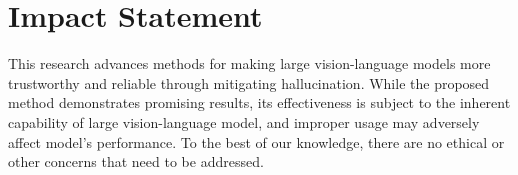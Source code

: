 \documentclass{article}
\theoremstyle{plain}
\theoremstyle{definition}
\theoremstyle{remark}
\begin{document}
\section*{Impact Statement}
This research advances methods for making large vision-language models more trustworthy and reliable through mitigating hallucination. While the proposed method demonstrates promising results, its effectiveness is subject to the inherent capability of large vision-language model, and improper usage may adversely affect model's performance. To the best of our knowledge, there are no ethical or other concerns that need to be addressed.






\newpage
\appendix
\onecolumn
\end{document}
